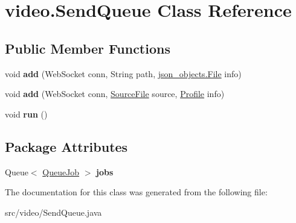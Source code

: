 \hypertarget{classvideo_1_1_send_queue}{
\section{video.SendQueue Class Reference}
\label{classvideo_1_1_send_queue}
}
\subsection*{Public Member Functions}
\begin{DoxyCompactItemize}
\item 
\hypertarget{classvideo_1_1_send_queue_a8ab5eff2adca0f9aadcce284e30d8b33}{
void {\bfseries add} (WebSocket conn, String path, \hyperlink{classjson__objects_1_1_file}{json\_\-objects.File} info)}
\label{classvideo_1_1_send_queue_a8ab5eff2adca0f9aadcce284e30d8b33}

\item 
\hypertarget{classvideo_1_1_send_queue_a67e78364a284a7922bb32c5634b0ca8c}{
void {\bfseries add} (WebSocket conn, \hyperlink{classvideo_1_1_source_file}{SourceFile} source, \hyperlink{classvideo_1_1_profile}{Profile} info)}
\label{classvideo_1_1_send_queue_a67e78364a284a7922bb32c5634b0ca8c}

\item 
\hypertarget{classvideo_1_1_send_queue_a3b20c502f066f199bafaefc489fdbaaa}{
void {\bfseries run} ()}
\label{classvideo_1_1_send_queue_a3b20c502f066f199bafaefc489fdbaaa}

\end{DoxyCompactItemize}
\subsection*{Package Attributes}
\begin{DoxyCompactItemize}
\item 
\hypertarget{classvideo_1_1_send_queue_a4636e229ecd2adfe181a7fd996d1ab44}{
Queue$<$ \hyperlink{classvideo_1_1_queue_job}{QueueJob} $>$ {\bfseries jobs}}
\label{classvideo_1_1_send_queue_a4636e229ecd2adfe181a7fd996d1ab44}

\end{DoxyCompactItemize}


The documentation for this class was generated from the following file:\begin{DoxyCompactItemize}
\item 
src/video/SendQueue.java\end{DoxyCompactItemize}
